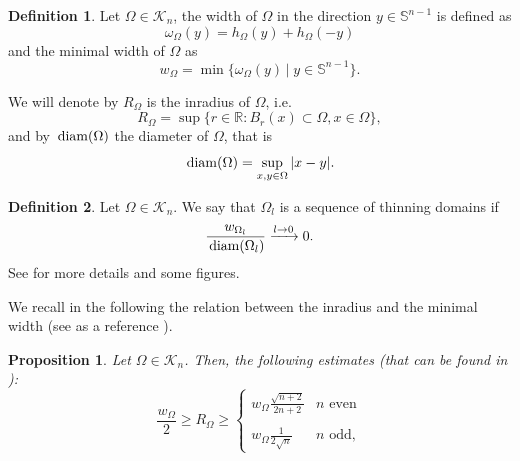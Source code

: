 \documentclass[oneside,a4paper,11pt,notitlepage]{article}
\theoremstyle{definition}
\newtheorem{definizione}{Definition}[section]
\theoremstyle{plain}
\newtheorem{prop}[teorema]{Proposition}
\theoremstyle{definition}
\DeclareMathOperator{\diam}{\, \textup{diam}}
\begin{document}
\begin{definizione}
Let $\Omega\in \mathcal{K}_n$, the width of $\Omega$ in the direction $y \in \mathbb{S}^{n-1}$ is defined as 
  \begin{equation*}
    \omega_{\Omega}(y)=h_{\Omega}(y)+h_{\Omega}(-y)
    \end{equation*}
 and the minimal width of $\Omega$ as
\begin{equation*}
    w_\Omega=\min\{  \omega_{\Omega}(y)\,|\; y\in\mathbb{S}^{n-1}\}.
\end{equation*}
\end{definizione}
We will denote by $R_\Omega$ is the inradius of $\Omega$, i.e.
 \begin{equation}
     \label{inradiuss}
     R_\Omega=\sup\{r\in \mathbb R: B_r(x)\subset \Omega, x\in \Omega\},
 \end{equation}
and by $\diam(\Omega)$ the diameter of $\Omega$, that is
\begin{equation*}
    \diam(\Omega) = \sup_{x,y\in\Omega}|x-y|.
\end{equation*}
\begin{definizione}
Let $\Omega\in \mathcal{K}_n$. We say that $\Omega_l$ is a sequence of thinning domains if
    \begin{equation*}
        \dfrac{w_{\Omega_l}}{\diam(\Omega_l)}\xrightarrow{l \to 0}0.
    \end{equation*}
See \cite{AMPS} for more details and some figures.
\end{definizione}



We recall in the following the relation between the inradius and the minimal width (see as a reference \cite{ scott_family, santalo_sobre,fenchel_bonnesen}).
\begin{prop}
\label{prop:r>w}
Let $\Omega\in \mathcal{K}_n$. Then,
the following estimates (that can be found in \cite[equation (9)]{fenchel_bonnesen}):
\begin{equation}
\label{eq:lowboundinradius}
    \displaystyle \frac{w_\Omega}{2}\ge R_{\Omega}\ge\begin{cases}
    w_{\Omega} \displaystyle{\frac{\sqrt{n+2}}{2n+2}} & n \,\, \text{even}\\ \\
    w_{\Omega} \displaystyle{\frac{1}{2\sqrt{n}}} & n \,\, \text{odd},
    \end{cases}
\end{equation}
\end{prop}
\end{document}
